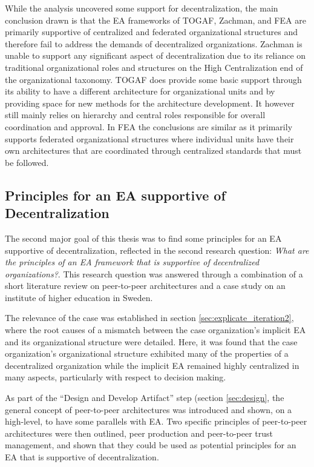 While the analysis uncovered some support for decentralization, the main conclusion drawn is that the EA frameworks of TOGAF, Zachman, and FEA are primarily supportive of centralized and federated organizational structures and therefore fail to address the demands of decentralized organizations. Zachman is unable to support any significant aspect of decentralization due to its reliance on traditional organizational roles and structures on the High Centralization end of the organizational taxonomy. TOGAF does provide some basic support through its ability to have a different architecture for organizational units and by providing space for new methods for the architecture development. It however still mainly relies on hierarchy and central roles responsible for overall coordination and approval. In FEA the conclusions are similar as it primarily supports federated organizational structures where individual units have their own architectures that are coordinated through centralized standards that must be followed.


\subsection{Principles for an EA supportive of Decentralization}

The second major goal of this thesis was to find some principles for an EA supportive of decentralization, reflected in the second research question: \textit{What are the principles of an EA framework that is supportive of decentralized organizations?}.  This research question was answered through a combination of a short literature review on peer-to-peer architectures and a case study on an institute of higher education in Sweden. 

The relevance of the case was established in section \ref{sec:explicate_iteration2}, where the root causes of a mismatch between the case organization's implicit EA and its organizational structure were detailed. Here, it was found that the case organization's organizational structure exhibited many of the properties of a decentralized organization while the implicit EA remained highly centralized in many aspects, particularly with respect to decision making. 

As part of the ``Design and Develop Artifact'' step (section \ref{sec:design}, the general concept of peer-to-peer architectures was introduced and shown, on a high-level, to have some parallels with EA. Two specific principles of peer-to-peer architectures were then outlined, peer production and peer-to-peer trust management, and shown that they could be used as potential principles for an EA that is supportive of decentralization. 


